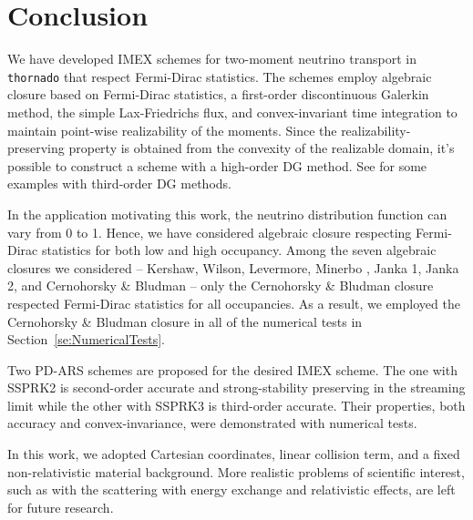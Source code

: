 \section{Conclusion}\label{se:Conclusion}

We have developed IMEX schemes for two-moment neutrino transport in \texttt{thornado} that respect Fermi-Dirac statistics.
The schemes employ algebraic closure based on Fermi-Dirac statistics, a first-order discontinuous Galerkin method, the simple Lax-Friedrichs flux, and convex-invariant time integration to maintain point-wise realizability of the moments.
Since the realizability-preserving property is obtained from the convexity of the realizable domain, it's possible to construct a scheme with a high-order DG method.
See \cite{chu_etal_2018} for some examples with third-order DG methods.

In the application motivating this work, the neutrino distribution function can vary from 0 to 1.
Hence, we have considered algebraic closure respecting Fermi-Dirac statistics for both low and high occupancy.
Among the seven algebraic closures we considered -- Kershaw\cite{kershaw_1976}, Wilson\cite{wilson_1975,leblancWilson_1970}, Levermore\cite{levermore_1984}, Minerbo \cite{minerbo_1978}, Janka 1\cite{janka_1991}, Janka 2\cite{janka_1992}, and Cernohorsky \& Bludman\cite{cernohorskyBludman_1994} -- only the Cernohorsky \& Bludman closure respected Fermi-Dirac statistics for all occupancies.
As a result, we employed the Cernohorsky \& Bludman closure in all of the numerical tests in Section~\ref{se:NumericalTests}.

Two PD-ARS schemes are proposed for the desired IMEX scheme.
The one with SSPRK2 is second-order accurate and strong-stability preserving in the streaming limit while the other with SSPRK3 is third-order accurate.
Their properties, both accuracy and convex-invariance, were demonstrated with numerical tests.

In this work, we adopted Cartesian coordinates, linear collision term, and a fixed non-relativistic material background.
More realistic problems of scientific interest, such as with the scattering with energy exchange and relativistic effects, are left for future research.